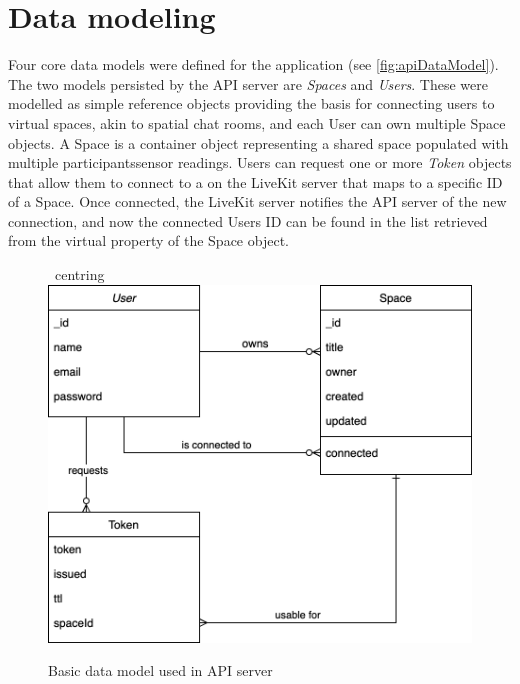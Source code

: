 \section{Data modeling}
\label{sec:datamodeling}

Four core data models were defined for the application (see \autoref{fig:apiDataModel}).
The two models persisted by the \ac{API} server are \emph{Spaces} and \emph{Users}.
These were modelled as simple reference objects providing the basis for connecting users to virtual spaces, akin to spatial chat rooms, and each User can own multiple Space objects.
A Space is a container object representing a shared space populated with multiple participants\textquotesingle sensor readings.
Users can request one or more \emph{Token} objects that allow them to connect to a  on the LiveKit server that maps to a specific ID of a Space.
Once connected, the LiveKit server notifies the \ac{API} server of the new connection, and now the connected User\textquotesingle s ID can be found in the list retrieved from the virtual  property of the Space object.

\begin{figure}[h]
\ centring
\includegraphics[scale=0.4]{04_Artefakte/01_Abbildungen/api-datamodel}
\caption[API data model]{Basic data model used in API server\protect}
\label{fig:apiDataModel}
\end{figure}

